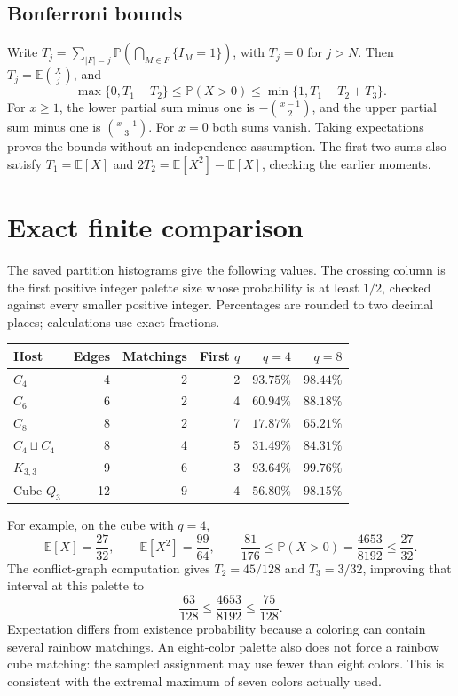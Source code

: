 \documentclass[10pt,letterpaper]{article}
\newcommand{\E}{\mathbb E}
\newcommand{\Prob}{\mathbb P}
\begin{document}
\subsection*{Bonferroni bounds}
Write $T_j=\sum_{|F|=j}\Prob(\bigcap_{M\in F}\{I_M=1\})$, with $T_j=0$
for $j>N$. Then $T_j=\E\binom{X}{j}$, and
\[
 \max\{0,T_1-T_2\}\le\Prob(X>0)\le\min\{1,T_1-T_2+T_3\}.
\]
For $x\ge1$, the lower partial sum minus one is
$-\binom{x-1}{2}$, and the upper partial sum minus one is
$\binom{x-1}{3}$. For $x=0$ both sums vanish. Taking expectations proves
the bounds without an independence assumption. The first two sums also
satisfy $T_1=\E[X]$ and $2T_2=\E[X^2]-\E[X]$, checking the earlier moments.

\section{Exact finite comparison}
The saved partition histograms give the following values. The crossing column
is the first positive integer palette size whose probability is at least
$1/2$, checked against every smaller positive integer. Percentages are rounded
to two decimal places; calculations use exact fractions.
\begin{center}
\begin{tabular}{lrrrrr}
\toprule
Host & Edges & Matchings & First $q$ & $q=4$ & $q=8$\\
\midrule
$C_4$ & 4 & 2 & 2 & $93.75\%$ & $98.44\%$\\
$C_6$ & 6 & 2 & 4 & $60.94\%$ & $88.18\%$\\
$C_8$ & 8 & 2 & 7 & $17.87\%$ & $65.21\%$\\
$C_4\sqcup C_4$ & 8 & 4 & 5 & $31.49\%$ & $84.31\%$\\
$K_{3,3}$ & 9 & 6 & 3 & $93.64\%$ & $99.76\%$\\
Cube $Q_3$ & 12 & 9 & 4 & $56.80\%$ & $98.15\%$\\
\bottomrule
\end{tabular}
\end{center}
For example, on the cube with $q=4$,
\[
 \E[X]=\frac{27}{32},\qquad \E[X^2]=\frac{99}{64},\qquad
 \frac{81}{176}\le\Prob(X>0)=\frac{4653}{8192}\le\frac{27}{32}.
\]
The conflict-graph computation gives $T_2=45/128$ and $T_3=3/32$, improving
that interval at this palette to
\[
 \frac{63}{128}\le\frac{4653}{8192}\le\frac{75}{128}.
\]
Expectation differs from existence probability because a coloring can contain
several rainbow matchings. An eight-color palette also does not force a
rainbow cube matching: the sampled assignment may use fewer than eight colors.
This is consistent with the extremal maximum of seven colors actually used.
\end{document}
